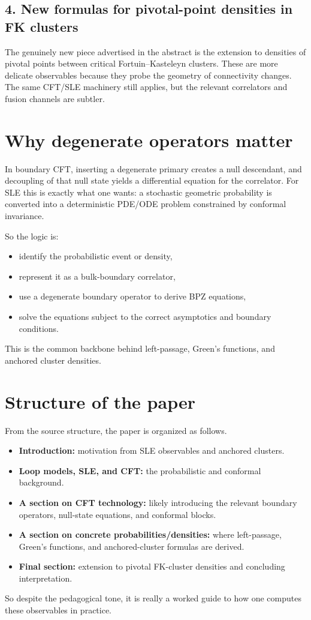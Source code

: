 \documentclass[11pt]{article}
\begin{document}
\subsection*{4. New formulas for pivotal-point densities in FK clusters}
The genuinely new piece advertised in the abstract is the extension to densities of pivotal points between critical Fortuin--Kasteleyn clusters. These are more delicate observables because they probe the geometry of connectivity changes. The same CFT/SLE machinery still applies, but the relevant correlators and fusion channels are subtler.
\section*{Why degenerate operators matter}
In boundary CFT, inserting a degenerate primary creates a null descendant, and decoupling of that null state yields a differential equation for the correlator. For SLE this is exactly what one wants: a stochastic geometric probability is converted into a deterministic PDE/ODE problem constrained by conformal invariance.

So the logic is:
\begin{itemize}[leftmargin=1.5em]
\item identify the probabilistic event or density,
\item represent it as a bulk-boundary correlator,
\item use a degenerate boundary operator to derive BPZ equations,
\item solve the equations subject to the correct asymptotics and boundary conditions.
\end{itemize}
This is the common backbone behind left-passage, Green's functions, and anchored cluster densities.
\section*{Structure of the paper}
From the source structure, the paper is organized as follows.
\begin{itemize}[leftmargin=1.5em]
\item \textbf{Introduction:} motivation from SLE observables and anchored clusters.
\item \textbf{Loop models, SLE, and CFT:} the probabilistic and conformal background.
\item \textbf{A section on CFT technology:} likely introducing the relevant boundary operators, null-state equations, and conformal blocks.
\item \textbf{A section on concrete probabilities/densities:} where left-passage, Green's functions, and anchored-cluster formulas are derived.
\item \textbf{Final section:} extension to pivotal FK-cluster densities and concluding interpretation.
\end{itemize}
So despite the pedagogical tone, it is really a worked guide to how one computes these observables in practice.
\end{document}
